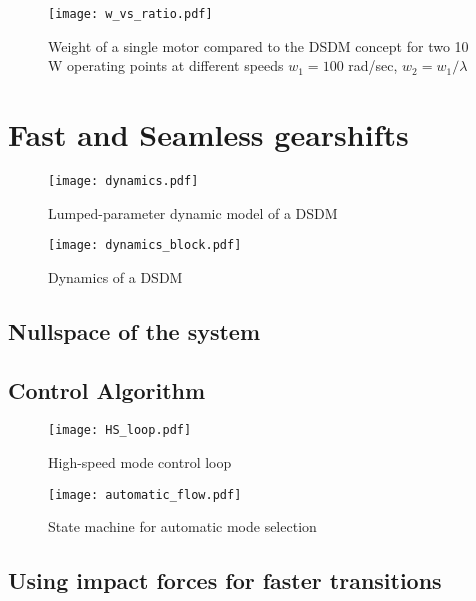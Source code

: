 \begin{figure}[H]
	\centering
		\texttt{[image: w\_vs\_ratio.pdf]}
	\caption{Weight of a single motor compared to the DSDM concept for two 10 W operating points at different speeds $w_1=100$ rad/sec, $w_2 = w_1 / \lambda$}
	\label{fig:1vs2}
\end{figure}


\section{Fast and Seamless gearshifts}
\label{sec:FastAndSeamlessGearshifts}

\begin{figure}[H]
	\centering
		\texttt{[image: dynamics.pdf]}
	\caption{Lumped-parameter dynamic model of a DSDM}
	\label{fig:dynamics}
\end{figure}

\begin{figure}[H]
	\centering
		\texttt{[image: dynamics\_block.pdf]}
	\caption{Dynamics of a DSDM}
	\label{fig:dynamics_block}
\end{figure}

\subsection{Nullspace of the system}

\subsection{Control Algorithm}


\begin{figure}[H]
	\centering
		\texttt{[image: HS\_loop.pdf]}
	\caption{High-speed mode control loop}
	\label{fig:HS_loop}
\end{figure}

\begin{figure}[H]
	\centering
		\texttt{[image: automatic\_flow.pdf]}
	\caption{State machine for automatic mode selection}
	\label{fig:automaticflow}
\end{figure}


\subsection{Using impact forces for faster transitions}


